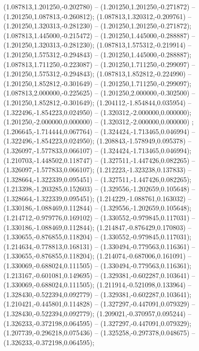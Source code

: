  (1.087813,1.201250,-0.202780) -- (1.201250,1.201250,-0.271872) -- (1.201250,1.087813,-0.260812);
 (1.087813,1.320312,-0.209761) -- (1.201250,1.320313,-0.281230) -- (1.201250,1.201250,-0.271872);
 (1.087813,1.445000,-0.215472) -- (1.201250,1.445000,-0.288887) -- (1.201250,1.320313,-0.281230);
 (1.087813,1.575312,-0.219914) -- (1.201250,1.575312,-0.294843) -- (1.201250,1.445000,-0.288887);
 (1.087813,1.711250,-0.223087) -- (1.201250,1.711250,-0.299097) -- (1.201250,1.575312,-0.294843);
 (1.087813,1.852812,-0.224990) -- (1.201250,1.852812,-0.301649) -- (1.201250,1.711250,-0.299097);
 (1.087813,2.000000,-0.225625) -- (1.201250,2.000000,-0.302500) -- (1.201250,1.852812,-0.301649);
 (1.204112,-1.854844,0.035954) -- (1.322496,-1.854223,0.024950) -- (1.320312,-2.000000,0.000000);
 (1.201250,-2.000000,0.000000) -- (1.320312,-2.000000,0.000000) ;
 (1.206645,-1.714444,0.067764) -- (1.324424,-1.713465,0.046994) -- (1.322496,-1.854223,0.024950);
 (1.208843,-1.578949,0.095378) -- (1.326097,-1.577833,0.066107) -- (1.324424,-1.713465,0.046994);
 (1.210703,-1.448502,0.118747) -- (1.327511,-1.447426,0.082265) -- (1.326097,-1.577833,0.066107);
 (1.212223,-1.323238,0.137833) -- (1.328664,-1.322339,0.095451) -- (1.327511,-1.447426,0.082265);
 (1.213398,-1.203285,0.152603) -- (1.329556,-1.202659,0.105648) -- (1.328664,-1.322339,0.095451);
 (1.214229,-1.088761,0.163032) -- (1.330186,-1.088469,0.112844) -- (1.329556,-1.202659,0.105648);
 (1.214712,-0.979776,0.169102) -- (1.330552,-0.979845,0.117031) -- (1.330186,-1.088469,0.112844);
 (1.214847,-0.876429,0.170803) -- (1.330655,-0.876855,0.118204) -- (1.330552,-0.979845,0.117031);
 (1.214634,-0.778813,0.168131) -- (1.330494,-0.779563,0.116361) -- (1.330655,-0.876855,0.118204);
 (1.214074,-0.687006,0.161091) -- (1.330069,-0.688024,0.111505) -- (1.330494,-0.779563,0.116361);
 (1.213167,-0.601081,0.149695) -- (1.329381,-0.602287,0.103641) -- (1.330069,-0.688024,0.111505);
 (1.211914,-0.521098,0.133964) -- (1.328430,-0.522394,0.092779) -- (1.329381,-0.602287,0.103641);
 (1.210421,-0.445801,0.114828) -- (1.327297,-0.447091,0.079329) -- (1.328430,-0.522394,0.092779);
 (1.209021,-0.370957,0.095244) -- (1.326233,-0.372198,0.064595) -- (1.327297,-0.447091,0.079329);
 (1.207739,-0.296218,0.075436) -- (1.325258,-0.297378,0.048675) -- (1.326233,-0.372198,0.064595);

